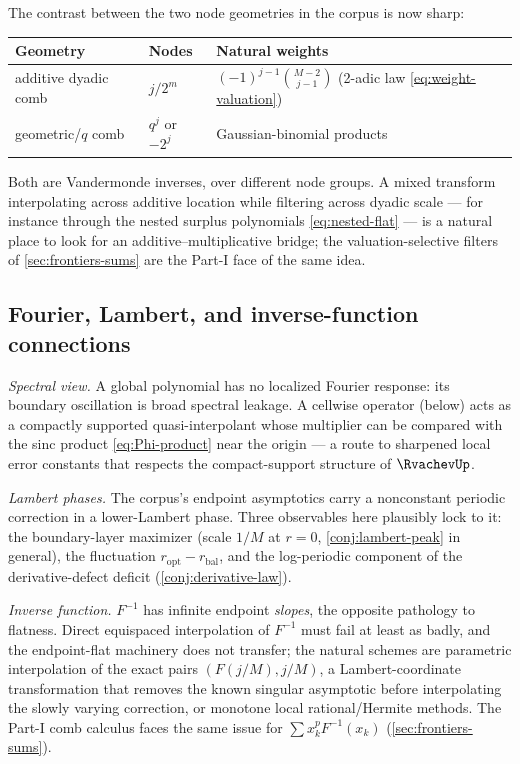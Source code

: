 \documentclass[11pt,oneside]{article}
\numberwithin{equation}{section}
\theoremstyle{definition}
\theoremstyle{remark}
\begin{document}
The contrast between the two node geometries in the corpus is now
sharp:
\begin{center}
\small
\begin{tabular}{@{}lll@{}}
\toprule
Geometry & Nodes & Natural weights\\
\midrule
additive dyadic comb & $j/2^{m}$ & $(-1)^{j-1}\binom{M-2}{j-1}$
(2-adic law \eqref{eq:weight-valuation})\\
geometric/$q$ comb & $q^{j}$ or $-2^{j}$ & Gaussian-binomial products\\
\bottomrule
\end{tabular}
\end{center}
Both are Vandermonde inverses, over different node groups.  A mixed
transform interpolating across additive location while filtering
across dyadic scale --- for instance through the nested surplus
polynomials \eqref{eq:nested-flat} --- is a natural place to look for
an additive--multiplicative bridge; the valuation-selective filters of
\cref{sec:frontiers-sums} are the Part-I face of the same idea.

\subsection{Fourier, Lambert, and inverse-function connections}

\emph{Spectral view.}  A global polynomial has no localized Fourier
response: its boundary oscillation is broad spectral leakage.  A
cellwise operator (below) acts as a compactly supported
quasi-interpolant whose multiplier can be compared with the sinc
product \eqref{eq:Phi-product} near the origin --- a route to
sharpened local error constants that respects the compact-support
structure of $\RvachevUp$.

\emph{Lambert phases.}  The corpus's endpoint asymptotics carry a
nonconstant periodic correction in a lower-Lambert phase.  Three
observables here plausibly lock to it: the boundary-layer maximizer
(scale $1/M$ at $r=0$, \cref{conj:lambert-peak} in general), the
fluctuation $r_{\mathrm{opt}}-r_{\mathrm{bal}}$, and the log-periodic
component of the derivative-defect deficit
(\cref{conj:derivative-law}).

\emph{Inverse function.}  $F^{-1}$ has infinite endpoint
\emph{slopes}, the opposite pathology to flatness.  Direct equispaced
interpolation of $F^{-1}$ must fail at least as badly, and the
endpoint-flat machinery does not transfer; the natural schemes are
parametric interpolation of the exact pairs $(F(j/M),j/M)$, a
Lambert-coordinate transformation that removes the known singular
asymptotic before interpolating the slowly varying correction, or
monotone local rational/Hermite methods.  The Part-I comb calculus
faces the same issue for $\sum x_k^{p}F^{-1}(x_k)$
(\cref{sec:frontiers-sums}).
\end{document}
